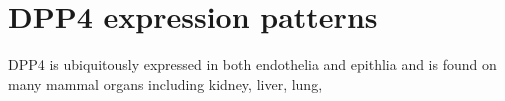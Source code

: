 \section{DPP4 expression patterns}
DPP4 is ubiquitously expressed in both endothelia and epithlia and is found on many mammal organs including kidney, liver, lung, 